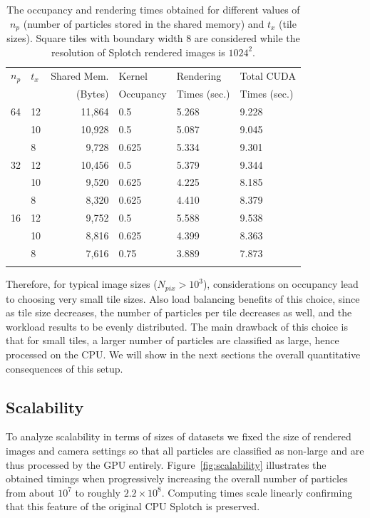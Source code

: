 \documentclass[preprint,5pt]{elsarticle}
\begin{document}
\begin{table}
\label{tab:tuning}
\begin{center}
\begin{tabular}{llrlll}
\hline \noalign{\smallskip}
$n_p$ & $t_x$ & Shared Mem. & Kernel & Rendering & Total CUDA \\
            & & (Bytes) & Occupancy & Times (sec.) & Times (sec.) \\
\noalign{\smallskip} \hline \noalign{\smallskip}
64   & 12 & 11,864 & 0.5 & 5.268 & 9.228 \\
      & 10 & 10,928 & 0.5 & 5.087  & 9.045 \\
      & 8 & 9,728 & 0.625 & 5.334  & 9.301 \\
32   & 12 & 10,456 & 0.5 & 5.379 & 9.344 \\
      & 10 & 9,520 & 0.625 & 4.225  & 8.185 \\
      & 8 & 8,320 & 0.625 & 4.410  & 8.379 \\
16  & 12 & 9,752 & 0.5 & 5.588 & 9.538 \\
      & 10 & 8,816 & 0.625 & 4.399 & 8.363 \\
      & 8 & 7,616 & 0.75 & 3.889 & 7.873 \\
\noalign{\smallskip} \hline
\end{tabular}
\caption{The occupancy and rendering times obtained for different values of $n_p$ (number of particles stored in the shared memory) and $t_x$ (tile sizes). Square tiles with boundary width 8 are considered while the resolution of Splotch rendered images is $1024^{2}.$}
\end{center}
\end{table}

Therefore, for typical image sizes ($N_{pix} > 10^3$), considerations on occupancy lead to choosing  very small tile sizes. Also load balancing benefits of this choice, since as tile size decreases, the number of particles per tile decreases as well, and the workload results to be evenly distributed.
The main drawback of this choice is that for small tiles, a larger number of particles are classified as large, hence processed on the CPU. We will show in the next sections the overall quantitative consequences of this setup.  

\subsection{Scalability}
\label{sec:scalability}
To analyze scalability in terms of sizes of datasets we fixed the size of rendered images and camera settings so that all particles are classified as non-large and are thus processed by the GPU entirely. 
Figure~\ref{fig:scalability} illustrates the obtained timings when progressively increasing the overall number of particles
from about $10^7$ to roughly $2.2\times10^8$. Computing times scale linearly confirming that this feature of the original CPU Splotch is preserved. 
\end{document}
